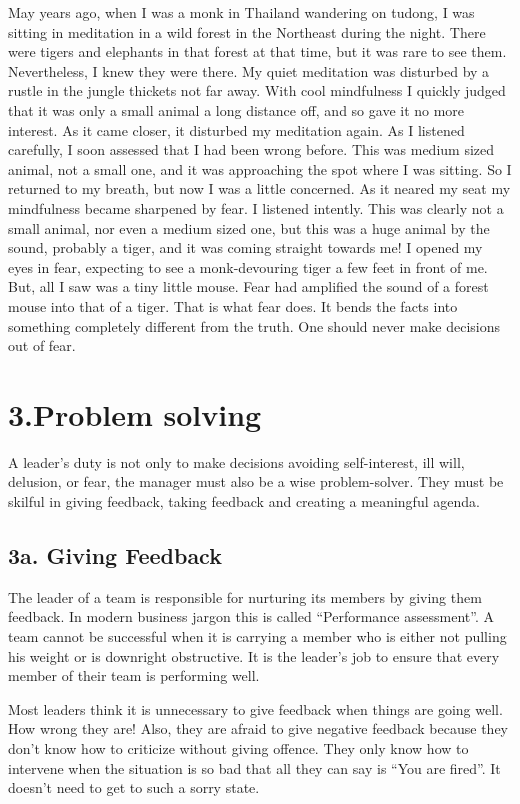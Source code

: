 \documentclass[12pt, openany]{book}
\begin{document}
May years ago, when I was a monk in Thailand wandering on tudong, I was sitting in meditation in a wild forest in the Northeast during the night. There were tigers and elephants in that forest at that time, but it was rare to see them. Nevertheless, I knew they were there. My quiet meditation was disturbed by a rustle in the jungle thickets not far away. With cool mindfulness I quickly judged that it was only a small animal a long distance off, and so gave it no more interest. As it came closer, it disturbed my meditation again. As I listened carefully, I soon assessed that I had been wrong before. This was medium sized animal, not a small one, and it was approaching the spot where I was sitting. So I returned to my breath, but now I was a little concerned. As it neared my seat my mindfulness became sharpened by fear. I listened intently. This was clearly not a small animal, nor even a medium sized one, but this was a huge animal by the sound, probably a tiger, and it was coming straight towards me! I opened my eyes in fear, expecting to see a monk-devouring tiger a few feet in front of me. But, all I saw was a tiny little mouse. Fear had amplified the sound of a forest mouse into that of a tiger. That is what fear does. It bends the facts into something completely different from the truth. One should never make decisions out of fear.

\chapter{3.Problem solving}

A leader’s duty is not only to make decisions avoiding self-interest, ill will, delusion, or fear, the manager must also be a wise problem-solver. They must be skilful in giving feedback, taking feedback and creating a meaningful agenda.


\section{3a. Giving Feedback}

The leader of a team is responsible for nurturing its members by giving them feedback. In modern business jargon this is called “Performance assessment”. A team cannot be successful when it is carrying a member who is either not pulling his weight or is downright obstructive. It is the leader’s job to ensure that every member of their team is performing well.

Most leaders think it is unnecessary to give feedback when things are going well. How wrong they are! Also, they are afraid to give negative feedback because they don’t know how to criticize without giving offence. They only know how to intervene when the situation is so bad that all they can say is “You are fired”. It doesn’t need to get to such a sorry state.
\end{document}
